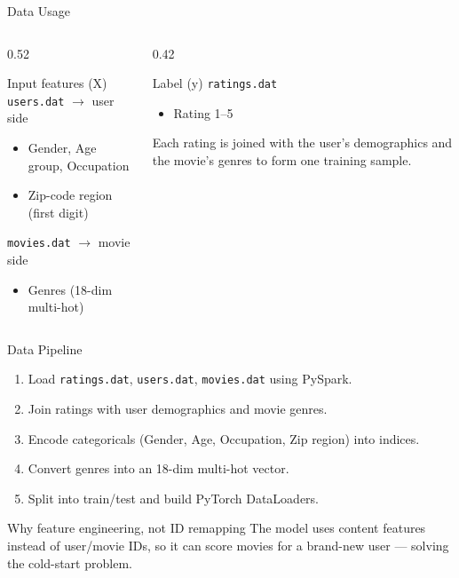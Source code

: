 \documentclass[aspectratio=169]{beamer}
\begin{document}
\begin{frame}{Data Usage}
\begin{columns}
  \begin{column}{0.52\textwidth}
    \begin{block}{Input features (X)}
      \texttt{users.dat} $\rightarrow$ user side
      \begin{itemize}
        \item Gender, Age group, Occupation
        \item Zip-code region (first digit)
      \end{itemize}
      \texttt{movies.dat} $\rightarrow$ movie side
      \begin{itemize}
        \item Genres (18-dim multi-hot)
      \end{itemize}
    \end{block}
  \end{column}
  \begin{column}{0.42\textwidth}
    \begin{block}{Label (y)}
      \texttt{ratings.dat}
      \begin{itemize}
        \item Rating 1--5
      \end{itemize}
      Each rating is joined with the user's demographics and the movie's genres
      to form one training sample.
    \end{block}
  \end{column}
\end{columns}
\end{frame}

\begin{frame}{Data Pipeline}
\begin{enumerate}
  \item Load \texttt{ratings.dat}, \texttt{users.dat}, \texttt{movies.dat} using PySpark.
  \item Join ratings with user demographics and movie genres.
  \item Encode categoricals (Gender, Age, Occupation, Zip region) into indices.
  \item Convert genres into an 18-dim multi-hot vector.
  \item Split into train/test and build PyTorch DataLoaders.
\end{enumerate}

\vspace{0.35cm}

\begin{block}{Why feature engineering, not ID remapping}
The model uses content features instead of user/movie IDs, so it can score
movies for a brand-new user --- solving the cold-start problem.
\end{block}
\end{frame}
\end{document}
